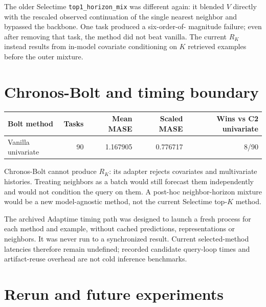 \documentclass[10pt,a4paper]{article}
\begin{document}
The older Selectime \texttt{top1\_horizon\_mix} was different again: it
blended $V$ directly with the rescaled observed continuation of the single
nearest neighbor and bypassed the backbone. One task produced a six-order-of-
magnitude failure; even after removing that task, the method did not beat
vanilla. The current $R_K$ instead results from in-model covariate conditioning
on $K$ retrieved examples before the outer mixture.

\section{Chronos-Bolt and timing boundary}

\begin{center}
\small
\begin{tabular}{lrrrr}
\toprule
Bolt method & Tasks & Mean MASE & Scaled MASE & Wins vs C2 univariate\\
\midrule
Vanilla univariate & 90 & 1.167905 & 0.776717 & 8/90\\
\bottomrule
\end{tabular}
\end{center}

Chronos-Bolt cannot produce $R_K$: its adapter rejects covariates and
multivariate histories. Treating neighbors as a batch would still forecast
them independently and would not condition the query on them. A post-hoc
neighbor-horizon mixture would be a new model-agnostic method, not the current
Selectime top-$K$ method.

The archived Adaptime timing path was designed to launch a fresh process for
each method and example, without cached predictions, representations or
neighbors. It was never run to a synchronized result. Current selected-method
latencies therefore remain undefined; recorded candidate query-loop times and
artifact-reuse overhead are not cold inference benchmarks.

\section{Rerun and future experiments}
\end{document}
